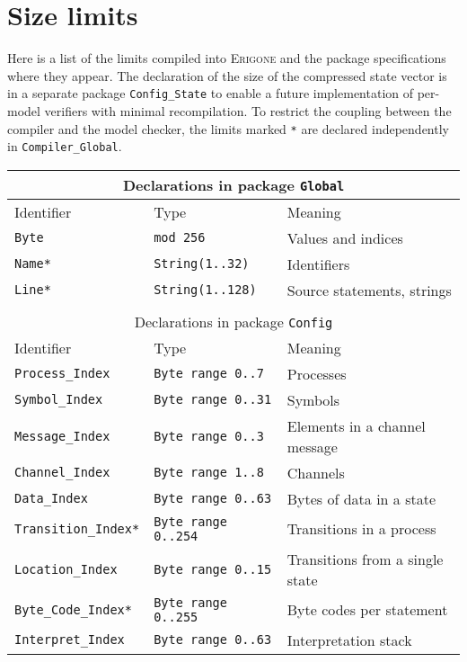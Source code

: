 \documentclass[11pt]{article}
\newcommand*{\prg}{\textsc{Erigone}}
\newcommand*{\p}[1]{\texttt{#1}}
\begin{document}
\appendix
\section{Size limits}\label{a.limits}

Here is a list of the limits compiled into \prg{} and the package
specifications where they appear. The declaration of the size of the
compressed state vector is in a separate package \p{Config\_State} to
enable a future implementation of per-model verifiers with minimal
recompilation. To restrict the coupling between the compiler and the
model checker, the limits marked \p{*} are declared independently in
\p{Compiler\_Global}.

\begin{center}
\begin{tabular}{|l|l|l|}\hline
\multicolumn{3}{|c|}{Declarations in package \p{Global}}\\\hline
Identifier & Type & Meaning\\\hline\hline
\p{Byte} & \p{mod 256} & Values and indices\\\hline
\p{Name*} & \p{String(1..32)} & Identifiers\\\hline
\p{Line*} & \p{String(1..128)} & Source statements, strings\\\hline
\multicolumn{3}{c}{}\\\hline
\multicolumn{3}{|c|}{Declarations in package \p{Config}}\\\hline
Identifier & Type & Meaning\\\hline\hline
\p{Process\_Index} & \p{Byte range 0..7} & Processes\\\hline
\p{Symbol\_Index} & \p{Byte range 0..31} & Symbols\\\hline
\p{Message\_Index} & \p{Byte range 0..3} & Elements in a channel message\\\hline
\p{Channel\_Index} & \p{Byte range 1..8} & Channels\\\hline
\p{Data\_Index} & \p{Byte range 0..63} & Bytes of data in a state\\\hline
\p{Transition\_Index*} & \p{Byte range 0..254} & Transitions in a process\\\hline
\p{Location\_Index} & \p{Byte range 0..15} & Transitions from a single state\\\hline
\p{Byte\_Code\_Index*} & \p{Byte range 0..255} & Byte codes per statement\\\hline
\p{Interpret\_Index} & \p{Byte range 0..63} & Interpretation stack\\\hline

\end{tabular}
\end{center}
\end{document}

